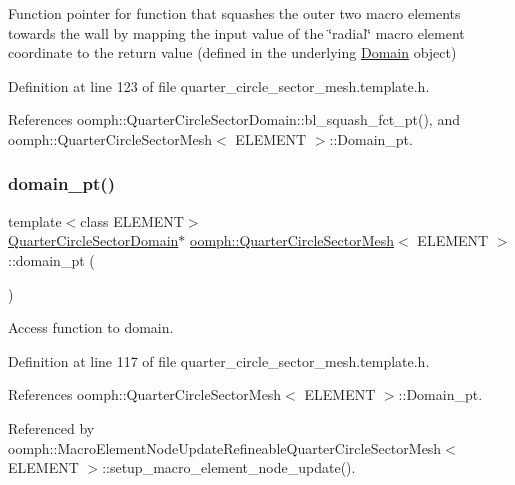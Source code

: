 Function pointer for function that squashes the outer two macro elements towards the wall by mapping the input value of the \char`\"{}radial\char`\"{} macro element coordinate to the return value (defined in the underlying \hyperlink{classoomph_1_1Domain}{Domain} object) 



Definition at line 123 of file quarter\+\_\+circle\+\_\+sector\+\_\+mesh.\+template.\+h.



References oomph\+::\+Quarter\+Circle\+Sector\+Domain\+::bl\+\_\+squash\+\_\+fct\+\_\+pt(), and oomph\+::\+Quarter\+Circle\+Sector\+Mesh$<$ E\+L\+E\+M\+E\+N\+T $>$\+::\+Domain\+\_\+pt.

\mbox{\label{classoomph_1_1QuarterCircleSectorMesh_a53adafee1a15301fe99a481b641df45b}} 
\subsubsection{\texorpdfstring{domain\+\_\+pt()}{domain\_pt()}}
{\footnotesize\ttfamily template$<$class E\+L\+E\+M\+E\+NT$>$ \\
\hyperlink{classoomph_1_1QuarterCircleSectorDomain}{Quarter\+Circle\+Sector\+Domain}$\ast$ \hyperlink{classoomph_1_1QuarterCircleSectorMesh}{oomph\+::\+Quarter\+Circle\+Sector\+Mesh}$<$ E\+L\+E\+M\+E\+NT $>$\+::domain\+\_\+pt (\begin{DoxyParamCaption}{ }\end{DoxyParamCaption})\hspace{0.3cm}{\ttfamily [inline]}}



Access function to domain. 



Definition at line 117 of file quarter\+\_\+circle\+\_\+sector\+\_\+mesh.\+template.\+h.



References oomph\+::\+Quarter\+Circle\+Sector\+Mesh$<$ E\+L\+E\+M\+E\+N\+T $>$\+::\+Domain\+\_\+pt.



Referenced by oomph\+::\+Macro\+Element\+Node\+Update\+Refineable\+Quarter\+Circle\+Sector\+Mesh$<$ E\+L\+E\+M\+E\+N\+T $>$\+::setup\+\_\+macro\+\_\+element\+\_\+node\+\_\+update().

